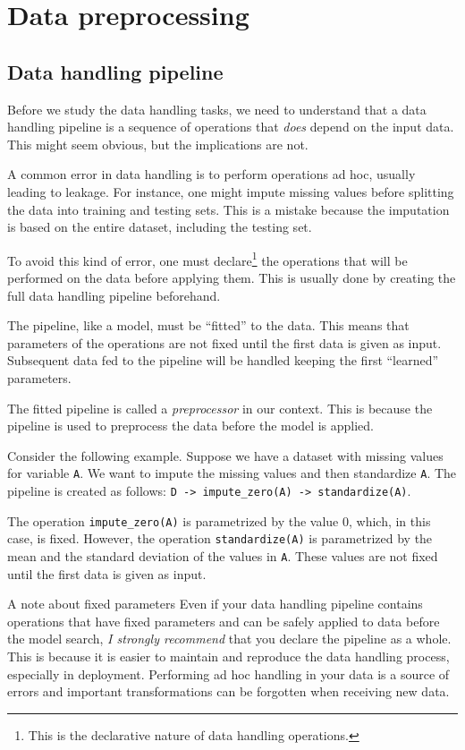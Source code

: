 \chapter{Data preprocessing}

\section{Data handling pipeline}

Before we study the data handling tasks, we need to understand that a data handling
pipeline is a sequence of operations that \emph{does} depend on the input data.
This might seem obvious, but the implications are not.

A common error in data handling is to perform operations ad hoc, usually leading to
\gls{leakage}.  For instance, one might impute missing values before splitting the data into
training and testing sets.  This is a mistake because the imputation is based on the
entire dataset, including the testing set.

To avoid this kind of error, one must declare\footnote{This is the declarative nature of
data handling operations.} the operations that will be performed on the data before
applying them.  This is usually done by creating the full data handling pipeline
beforehand.

The pipeline, like a model, must be ``fitted'' to the data.  This means that parameters of
the operations are not fixed until the first data is given as input.  Subsequent data fed
to the pipeline will be handled keeping the first ``learned'' parameters.

The fitted pipeline is called a \emph{preprocessor} in our context.  This is because the
pipeline is used to preprocess the data before the model is applied.

Consider the following example.  Suppose we have a dataset with missing values for
variable \texttt{A}.  We want to impute the missing values and then standardize
\texttt{A}.  The pipeline is created as follows:  \texttt{D -> impute\_zero(A) ->
standardize(A)}.

The operation \texttt{impute\_zero(A)} is parametrized by the value 0, which, in this case,
is fixed.  However, the operation \texttt{standardize(A)} is parametrized by the mean and
the standard deviation of the values in \texttt{A}.  These values are not fixed until the
first data is given as input.

\begin{hlbox}{A note about fixed parameters}
  Even if your data handling pipeline contains operations that have fixed parameters and
  can be safely applied to data before the model search, \emph{I strongly recommend} that
  you declare the pipeline as a whole.  This is because it is easier to maintain and
  reproduce the data handling process, especially in deployment.  Performing ad hoc
  handling in your data is a source of errors and important transformations can be
  forgotten when receiving new data.
\end{hlbox}


